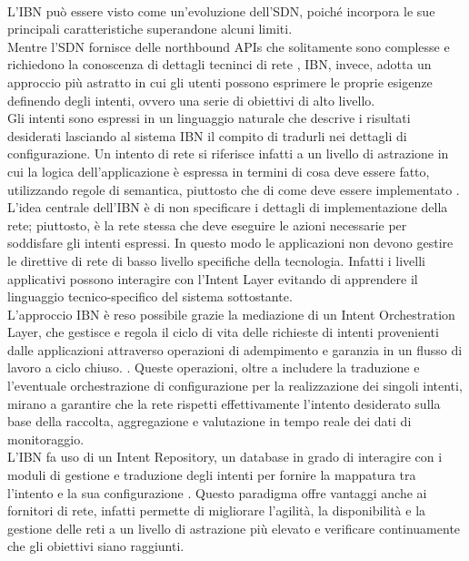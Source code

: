 \\L'IBN può essere visto come un'evoluzione dell'SDN, poiché incorpora le sue principali caratteristiche superandone alcuni limiti.
\\Mentre l'SDN fornisce delle northbound APIs che solitamente sono complesse e richiedono la conoscenza di dettagli tecninci di rete \cite{motivibn},
IBN, invece, adotta un approccio più astratto in cui gli utenti possono esprimere le proprie esigenze definendo degli intenti, ovvero una serie di obiettivi di alto livello.
\\Gli intenti sono espressi in un linguaggio naturale che descrive i risultati desiderati lasciando al sistema IBN il compito di tradurli nei dettagli di configurazione.
Un intento di rete si riferisce infatti a un livello di astrazione in cui la logica dell'applicazione è espressa in termini di cosa deve essere fatto, utilizzando regole di semantica, piuttosto che di come deve essere implementato \cite{ibn2}.
L'idea centrale dell'IBN è di non specificare i dettagli di implementazione della rete; piuttosto, è la rete stessa che deve eseguire le azioni necessarie per soddisfare gli intenti espressi.
In questo modo le applicazioni non devono gestire le direttive di rete di basso livello specifiche della tecnologia. Infatti i livelli applicativi possono interagire con l'Intent Layer evitando di apprendere il linguaggio tecnico-specifico del sistema sottostante.
\\L'approccio IBN è reso possibile grazie la mediazione di un Intent Orchestration Layer, che gestisce e regola il ciclo di vita delle richieste di intenti provenienti dalle applicazioni attraverso operazioni 
di adempimento e garanzia in un flusso di lavoro a ciclo chiuso. \cite{ibn}.
Queste operazioni, oltre a includere la traduzione e l'eventuale orchestrazione di configurazione per la realizzazione dei singoli intenti, mirano a garantire che la rete rispetti effettivamente l'intento desiderato 
sulla base della raccolta, aggregazione e valutazione in tempo reale dei dati di monitoraggio.
\\L'IBN fa uso di un Intent Repository, un database in grado di interagire con i moduli di gestione e traduzione 
degli intenti per fornire la mappatura tra l'intento e la sua configurazione \cite{ibnrepo}.
Questo paradigma offre vantaggi anche ai fornitori di rete, infatti permette di migliorare l'agilità, la disponibilità
e la gestione delle reti a un livello di astrazione più elevato e verificare continuamente che gli obiettivi siano raggiunti. 

